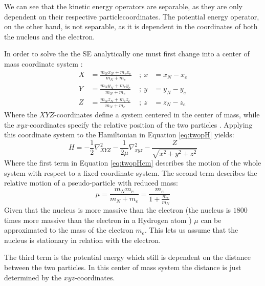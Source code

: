 \documentclass[../master_thesis.tex]{subfiles}
\begin{document}
We can see that the kinetic energy operators are separable, as they are only
dependent on their respective particlecoordinates. The potential energy
operator, on the other hand, is not separable, as it is dependent in the
coordinates of both the nucleus and the electron.

In order to solve the the \ac{SE} analytically one must first change into a
center of mass coordinate system :
\begin{equation}
  \begin{alignat}{3}
    X &= \frac{m_Nx_N + m_ex_e}{m_N + m_e} ~&;~ x &= x_N - x_e \\
    Y &= \frac{m_Ny_N + m_ey_e}{m_N + m_e} ~&;~ y &= y_N - y_e \\
    Z &= \frac{m_Nz_N + m_ez_e}{m_N + m_e} ~&;~ z &=
    z_N - z_e \label{eq:cmparam}
  \end{alignat} %
\end{equation}
Where the $XYZ$-coordinates define a system centered in the center of mass,
while the $xyz$-coordinates specify the relative position of the two particles
\cite{Jensen:2017}. Applying this coordinate system to the Hamiltonian in
Equation \ref{eq:twopH} yields:
\begin{equation}
  H = -\frac{1}{2}\nabla^2_{XYZ} -\frac{1}{2\mu}\nabla^2_{xyz} -
  \frac{Z}{\sqrt{x^2 + y^2 + z^2}}\label{eq:twopHcm}
\end{equation}
Where the first term in Equation \ref{eq:twopHcm} describes the motion of the
whole system with respect to a fixed coordinate system. The second term
describes the relative motion of a pseudo-particle with reduced mass:
\begin{equation}
  \mu = \frac{m_Nm_e}{m_N + m_e} = \frac{m_e}{1 + \frac{m_e}{m_N}}
\end{equation}
Given that the nucleus is more massive than the electron (the nucleus is $1800$
times more massive than the electron in a Hydrogen atom \cite{Jensen:2017})
$\mu$ can be approximated to the mass of the electron $m_e$. This lets us
assume that the nucleus is stationary in relation with the electron.

The third term is the potential energy which still is dependent on the distance
between the two particles. In this center of mass system the distance is just
determined by the $xyz$-coordinates.
\end{document}
